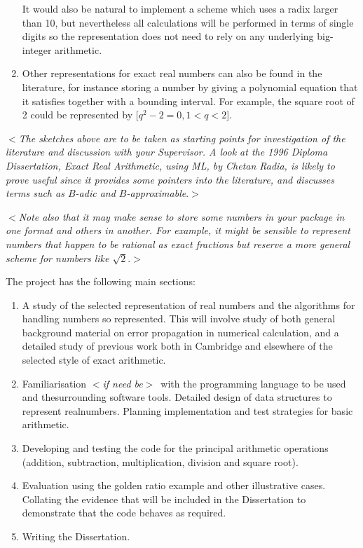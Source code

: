 \documentclass[12pt]{article}
\newcommand{\al}{$<$}
\newcommand{\ar}{$>$}
\begin{document}
\begin{enumerate}
It would also be natural to implement a scheme which uses a
radix larger than 10, but nevertheless all calculations will be
performed in terms of single digits so the representation does not
need to rely on any underlying big-integer arithmetic.

\item Other representations for exact real numbers can also be
found in the literature, for instance storing a number by giving
a polynomial equation that it satisfies together with a bounding
interval.  For example, the square root of 2 could be represented by
[$q^2-2=0, 1 < q < 2$].

\end{enumerate}

\al\emph{The sketches above are to be taken as starting points for
  investigation of the literature and discussion with your Supervisor.
  A look at the 1996 Diploma Dissertation, {\rm Exact Real Arithmetic,
    using ML}, by Chetan Radia, is likely to prove useful since it
  provides some pointers into the literature, and discusses terms such
  as $B$-adic and $B$-approximable}.\ar

\al\emph{Note also that it may make sense to store some numbers in
  your package in one format and others in another.  For example, it
  might be sensible to represent numbers that happen to be rational as
  exact fractions but reserve a more general scheme for numbers like
  $\sqrt2$}.\ar

\bigskip
The project has the following main sections:

\begin{enumerate}

\item A study of the selected representation of real numbers and the
  algorithms for handling numbers so represented.  This will involve
  study of both general background material on error propagation in
  numerical calculation, and a detailed study of previous work both in
  Cambridge and elsewhere of the selected style of exact arithmetic.

\item Familiarisation \al\emph{if need be}\ar\ with the programming
  language to be used and the\break surrounding software tools.  Detailed
  design of data structures to represent real\break numbers.  Planning
  implementation and test strategies for basic arithmetic.

\item Developing and testing the code for the principal arithmetic
  operations (addition, subtraction, multiplication, division and
  square root).

\item Evaluation using the golden ratio example and other illustrative
  cases. Collating the evidence that will be included in the
  Dissertation to demonstrate that the code behaves as required.

\item Writing the Dissertation.

\end{enumerate}
\end{document}
